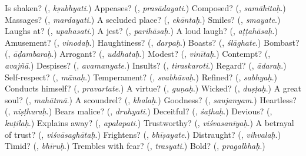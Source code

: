 \begin{tcolorbox}[breakable,colback=teal!4,colframe=teal!35!black,title={Before you move on}]
Is shaken? (\textbf{}, \emph{kṣubhyati}.) Appeases? (\textbf{}, \emph{prasādayati}.) Composed? (\textbf{}, \emph{samāhitaḥ}.) Massages? (\textbf{}, \emph{mardayati}.) A secluded place? (\textbf{}, \emph{ekāntaḥ}.) Smiles? (\textbf{}, \emph{smayate}.) Laughs at? (\textbf{}, \emph{upahasati}.) A jest? (\textbf{}, \emph{parihāsaḥ}.) A loud laugh? (\textbf{}, \emph{aṭṭahāsaḥ}.) Amusement? (\textbf{}, \emph{vinodaḥ}.) Haughtiness? (\textbf{}, \emph{darpaḥ}.) Boasts? (\textbf{}, \emph{ślāghate}.) Bombast? (\textbf{}, \emph{āḍambaraḥ}.) Arrogant? (\textbf{}, \emph{uddhataḥ}.) Modest? (\textbf{}, \emph{vinītaḥ}.) Contempt? (\textbf{}, \emph{avajñā}.) Despises? (\textbf{}, \emph{avamanyate}.) Insults? (\textbf{}, \emph{tiraskaroti}.) Regard? (\textbf{}, \emph{ādaraḥ}.) Self-respect? (\textbf{}, \emph{mānaḥ}.) Temperament? (\textbf{}, \emph{svabhāvaḥ}.) Refined? (\textbf{}, \emph{sabhyaḥ}.) Conducts himself? (\textbf{}, \emph{pravartate}.) A virtue? (\textbf{}, \emph{guṇaḥ}.) Wicked? (\textbf{}, \emph{duṣṭaḥ}.) A great soul? (\textbf{}, \emph{mahātmā}.) A scoundrel? (\textbf{}, \emph{khalaḥ}.) Goodness? (\textbf{}, \emph{saujanyam}.) Heartless? (\textbf{}, \emph{niṣṭhuraḥ}.) Bears malice? (\textbf{}, \emph{druhyati}.) Deceitful? (\textbf{}, \emph{śaṭhaḥ}.) Devious? (\textbf{}, \emph{kuṭilaḥ}.) Explains away? (\textbf{}, \emph{apalapati}.) Trustworthy? (\textbf{}, \emph{viśvasanīyaḥ}.) A betrayal of trust? (\textbf{}, \emph{viśvāsaghātaḥ}.) Frightens? (\textbf{}, \emph{bhīṣayate}.) Distraught? (\textbf{}, \emph{vihvalaḥ}.) Timid? (\textbf{}, \emph{bhīruḥ}.) Trembles with fear? (\textbf{}, \emph{trasyati}.) Bold? (\textbf{}, \emph{pragalbhaḥ}.)
\end{tcolorbox}
